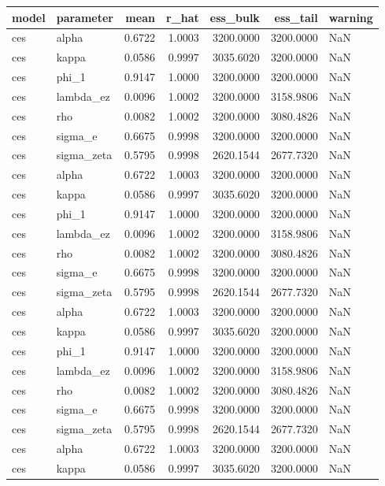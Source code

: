 \begin{tabular}{llrrrrl}
\toprule
model & parameter & mean & r\_hat & ess\_bulk & ess\_tail & warning \\
\midrule
ces & alpha & 0.6722 & 1.0003 & 3200.0000 & 3200.0000 & NaN \\
ces & kappa & 0.0586 & 0.9997 & 3035.6020 & 3200.0000 & NaN \\
ces & phi\_1 & 0.9147 & 1.0000 & 3200.0000 & 3200.0000 & NaN \\
ces & lambda\_ez & 0.0096 & 1.0002 & 3200.0000 & 3158.9806 & NaN \\
ces & rho & 0.0082 & 1.0002 & 3200.0000 & 3080.4826 & NaN \\
ces & sigma\_e & 0.6675 & 0.9998 & 3200.0000 & 3200.0000 & NaN \\
ces & sigma\_zeta & 0.5795 & 0.9998 & 2620.1544 & 2677.7320 & NaN \\
ces & alpha & 0.6722 & 1.0003 & 3200.0000 & 3200.0000 & NaN \\
ces & kappa & 0.0586 & 0.9997 & 3035.6020 & 3200.0000 & NaN \\
ces & phi\_1 & 0.9147 & 1.0000 & 3200.0000 & 3200.0000 & NaN \\
ces & lambda\_ez & 0.0096 & 1.0002 & 3200.0000 & 3158.9806 & NaN \\
ces & rho & 0.0082 & 1.0002 & 3200.0000 & 3080.4826 & NaN \\
ces & sigma\_e & 0.6675 & 0.9998 & 3200.0000 & 3200.0000 & NaN \\
ces & sigma\_zeta & 0.5795 & 0.9998 & 2620.1544 & 2677.7320 & NaN \\
ces & alpha & 0.6722 & 1.0003 & 3200.0000 & 3200.0000 & NaN \\
ces & kappa & 0.0586 & 0.9997 & 3035.6020 & 3200.0000 & NaN \\
ces & phi\_1 & 0.9147 & 1.0000 & 3200.0000 & 3200.0000 & NaN \\
ces & lambda\_ez & 0.0096 & 1.0002 & 3200.0000 & 3158.9806 & NaN \\
ces & rho & 0.0082 & 1.0002 & 3200.0000 & 3080.4826 & NaN \\
ces & sigma\_e & 0.6675 & 0.9998 & 3200.0000 & 3200.0000 & NaN \\
ces & sigma\_zeta & 0.5795 & 0.9998 & 2620.1544 & 2677.7320 & NaN \\
ces & alpha & 0.6722 & 1.0003 & 3200.0000 & 3200.0000 & NaN \\
ces & kappa & 0.0586 & 0.9997 & 3035.6020 & 3200.0000 & NaN \\

\end{tabular}
